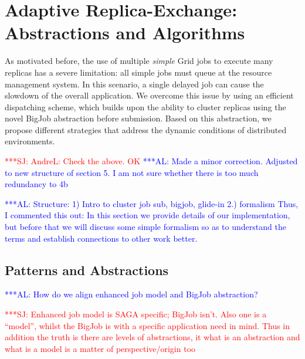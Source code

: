 \documentclass{rspublic}
\newcommand{\alnote}[1]{ {\textcolor{blue} { ***AL: #1 }}}
\newcommand{\jhanote}[1]{ {\textcolor{red} { ***SJ: #1 }}}
\newcommand{\alnote}[1]{}
\newcommand{\jhanote}[1]{}
\begin{document}
\section{Adaptive Replica-Exchange: Abstractions and Algorithms}
\label{sec:glidein}

As motivated before, the use of multiple {\it simple} Grid jobs to
execute many replicas has a severe limitation: all simple jobs must
queue at the resource management system. In this scenario, a single 
delayed job can cause the slowdown of the overall application. 
We overcome this issue by using an efficient dispatching scheme, 
which builds upon the ability to cluster replicas using the novel 
BigJob abstraction before submission. Based on this abstraction, we
propose different strategies that address the dynamic conditions
of distributed environments. 

\jhanote{AndreL: Check the above. OK}
\alnote{Made a minor correction. Adjusted to new structure of section 5. I
am not sure whether there is too much redundancy to 4b}


  \alnote{Structure: 1) Intro to cluster job sub, bigjob, glide-in 2.)
    formalism Thus, I commented this out: In this section we provide
    details of our implementation, but before that we will discuss
    some simple formalism so as to understand the terms and establish
    connections to other work better.  }

               
\subsection{Patterns and Abstractions}
\alnote{How do we align enhanced job model and BigJob abstraction?}

\jhanote{Enhanced job model is SAGA specific; BigJob isn't. Also one
  is a ``model'', whilst the BigJob is with a specific application
  need in mind. Thus in addition the truth is there are levels of
  abstractions, it what is an abstraction and what is a model is a
  matter of perspective/origin too}              
\end{document}
